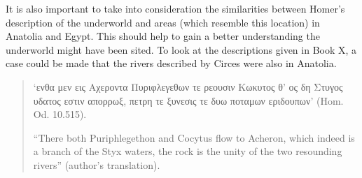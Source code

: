 	
	
		
	It is also important to take into consideration the similarities between Homer’s description of the underworld and areas (which resemble this location) in Anatolia and Egypt. This should help to gain a better understanding the underworld might have been sited. To look at the descriptions given in Book X, a case could be made that the rivers described by Circes were also in Anatolia. 
	
	\begin{quote}
		
	‘ενθα μεν εις Αχεροντα Πυριφλεγεθων τε ρεουσιν
	Κωκυτος θ’ ος δη Στυγος υδατος εστιν απορρωξ,
	πετρη τε ξυνεσις τε δυω ποταμων εριδουπων’ (Hom. Od. 10.515).
		
	“There both Puriphlegethon and Cocytus flow to Acheron, which indeed is a branch of the Styx waters, the rock is the unity of the two resounding rivers” (author’s translation).
	\end{quote}

